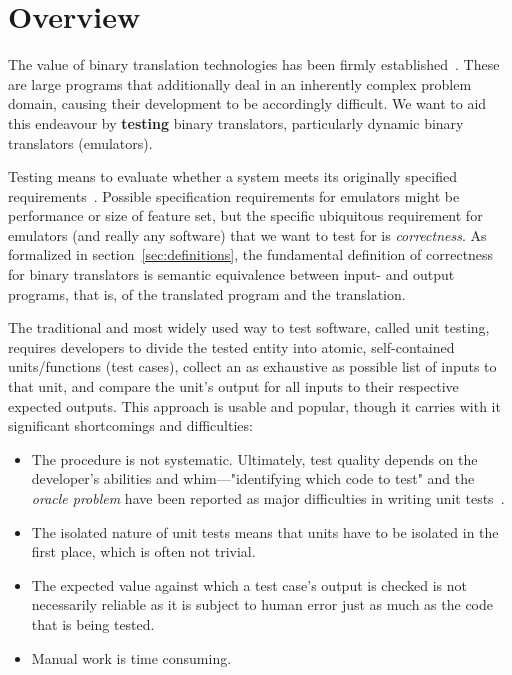 \chapter{Overview}\label{chapter:overview}

The value of binary translation technologies has been firmly established~\cite{altman2000welcome, sites1993binary,
probst2002dynamic}. These are large programs that additionally deal in an inherently complex problem domain, causing
their development to be accordingly difficult. We want to aid this endeavour by \textbf{testing} binary translators,
particularly dynamic binary translators (emulators).

Testing means to evaluate whether a system meets its originally specified requirements~\cite{jamil2016software_testing}.
Possible specification requirements for emulators might be performance or size of feature set, but the specific
ubiquitous requirement for emulators (and really any software) that we want to test for is \textit{correctness}. As
formalized in section~\ref{sec:definitions}, the fundamental definition of correctness for binary translators is
semantic equivalence between input- and output programs, that is, of the translated program and the translation.

The traditional and most widely used way to test software, called unit testing, requires developers to divide the tested
entity into atomic, self-contained units/functions (test cases), collect an as exhaustive as possible list of inputs to
that unit, and compare the unit's output for all inputs to their respective expected outputs. This approach is usable
and popular, though it carries with it significant shortcomings and difficulties:

\begin{itemize}
    \item The procedure is not systematic. Ultimately, test quality depends on the developer's abilities and
        whim---"identifying which code to test" and the \textit{oracle problem} have been reported as major
        difficulties in writing unit tests~\cite{Daka+2014UnitTestingSurvey}.
    \item The isolated nature of unit tests means that units have to be isolated in the first place, which is often not
        trivial.
    \item The expected value against which a test case's output is checked is not necessarily reliable as it is subject
        to human error just as much as the code that is being tested.
    \item Manual work is time consuming.
\end{itemize}


